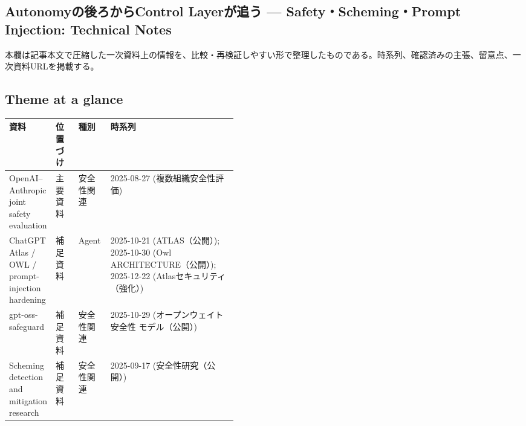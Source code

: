\subsection*{Autonomyの後ろからControl Layerが追う — Safety・Scheming・Prompt Injection: Technical Notes}
本欄は記事本文で圧縮した一次資料上の情報を、比較・再検証しやすい形で整理したものである。時系列、確認済みの主張、留意点、一次資料URLを掲載する。
\medskip
\subsection*{Theme at a glance}
\begin{center}
\footnotesize
\begin{tabularx}{\linewidth}{@{}p{0.20\linewidth}p{0.10\linewidth}p{0.14\linewidth}X@{}}
\toprule
資料 & 位置づけ & 種別 & 時系列 \\
\midrule
OpenAI–Anthropic joint safety evaluation & 主要資料 & 安全性関連 & 2025-08-27 (複数組織安全性評価)    \\
ChatGPT Atlas / OWL / prompt-injection hardening & 補足資料 & Agent & 2025-10-21 (ATLAS（公開）); 2025-10-30 (Owl ARCHITECTURE（公開）); 2025-12-22 (Atlasセキュリティ（強化）)    \\
gpt-oss-safeguard & 補足資料 & 安全性関連 & 2025-10-29 (オープンウェイト 安全性 モデル（公開）)    \\
Scheming detection and mitigation research & 補足資料 & 安全性関連 & 2025-09-17 (安全性研究（公開）)    \\
\bottomrule
\end{tabularx}
\end{center}
\normalsize

